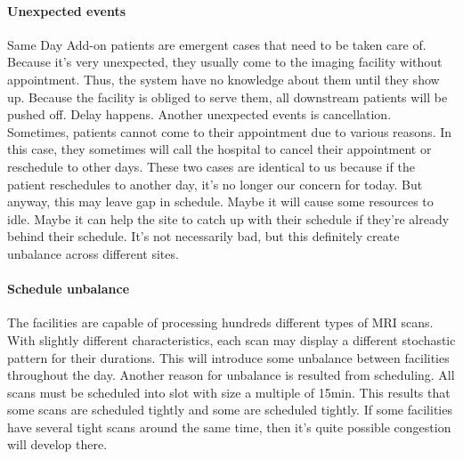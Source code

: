 \paragraph{Unexpected events} Same Day Add-on patients are emergent cases that need to be taken care of. Because it's very unexpected, they usually come to the imaging facility without appointment. Thus, the system have no knowledge about them until they show up. Because the facility is obliged to serve them, all downstream patients will be pushed off. Delay happens. Another unexpected events is cancellation. Sometimes, patients cannot come to their appointment due to various reasons. In this case, they sometimes will call the hospital to cancel their appointment or reschedule to other days. These two cases are identical to us because if the patient reschedules to another day, it's no longer our concern for today. But anyway, this may leave gap in schedule. Maybe it will cause some resources to idle. Maybe it can help the site to catch up with their schedule if they're already behind their schedule. It's not necessarily bad, but this definitely create unbalance across different sites.

\paragraph{Schedule unbalance} The facilities are capable of processing hundreds different types of MRI scans. With slightly different characteristics, each scan may display a different stochastic pattern for their durations. This will introduce some unbalance between facilities throughout the day. Another reason for unbalance is resulted from scheduling. All scans must be scheduled into slot with size a multiple of 15min. This results that some scans are scheduled tightly and some are scheduled tightly. If some facilities have several tight scans around the same time, then it's quite possible congestion will develop there.
